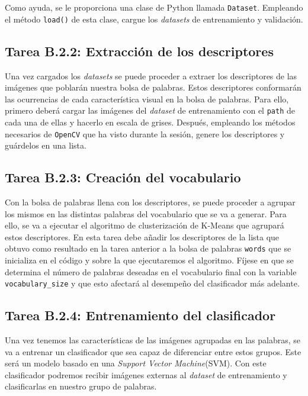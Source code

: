 Como ayuda, se le proporciona una clase de Python llamada \texttt{Dataset}. Empleando el método \texttt{load()} de esta clase, cargue los \textit{datasets} de entrenamiento y validación.

\subsection*{Tarea B.2.2: Extracción de los descriptores}

Una vez cargados los \textit{datasets} se puede proceder a extraer los descriptores de las imágenes que poblarán nuestra bolsa de palabras. Estos descriptores conformarán las ocurrencias de cada característica visual en la bolsa de palabras. Para ello, primero deberá cargar las imágenes del \textit{dataset} de entrenamiento con el \texttt{path} de cada una de ellas y hacerlo en escala de grises. Después, empleando los métodos necesarios de \texttt{OpenCV} que ha visto durante la sesión, genere los descriptores y guárdelos en una lista.

\subsection*{Tarea B.2.3: Creación del vocabulario}

Con la bolsa de palabras llena con los descriptores, se puede proceder a agrupar los mismos en las distintas palabras del vocabulario que se va a generar. Para ello, se va a ejecutar el algoritmo de clusterización de K-Means que agrupará estos descriptores. En esta tarea debe añadir los descriptores de la lista que obtuvo como resultado en la tarea anterior a la bolsa de palabras \texttt{words} que se inicializa en el código y sobre la que ejecutaremos el algoritmo. Fíjese en que se determina el número de palabras deseadas en el vocabulario final con la variable \texttt{vocabulary\_size} y que esto afectará al desempeño del clasificador más adelante.

\subsection*{Tarea B.2.4: Entrenamiento del clasificador}

Una vez tenemos las características de las imágenes agrupadas en las palabras, se va a entrenar un clasificador que sea capaz de diferenciar entre estos grupos. Este será un modelo basado en una  \textit{Support Vector Machine}(SVM). Con este clasificador podremos recibir imágenes externas al \textit{dataset} de entrenamiento y clasificarlas en nuestro grupo de palabras.

